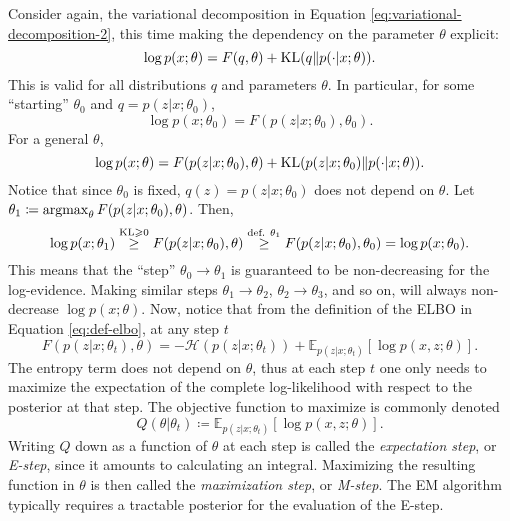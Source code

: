 \documentclass[../../main.tex]{subfiles} %
\begin{document}
Consider again, the variational decomposition in Equation 
\ref{eq:variational-decomposition-2}, this time making the dependency on 
the parameter \(\theta\) explicit:
\begin{equation*}
	\log{p(x; \theta)} = F(q, \theta) + \operatorname{KL} (q \Vert p(\cdot \vert x; 
	\theta)).
\end{equation*}
This is valid for all distributions \(q\) and parameters \(\theta\). In 
particular, for some ``starting'' \(\theta_0\) and \(q = p(z \vert x; 
\theta_0)\),
\begin{equation} \label{eq:loglik-initial}
	\log{p(x; \theta_0)} = F(p(z \vert x; \theta_0), \theta_0).
\end{equation}
For a general \(\theta\),
\begin{equation}
	\log{p(x; \theta)} = F(p(z \vert x; \theta_0), \theta) + \operatorname{KL} (p(z \vert x; 
	\theta_0) \Vert p(\cdot \vert x; 
	\theta)).
\end{equation}
Notice that since \(\theta_0\) is fixed, \(q(z) = p(z \vert x; \theta_0)\) does 
not depend on \(\theta\). Let \(\theta_1 \coloneqq \operatorname*{argmax}_\theta F(p(z \vert 
x; \theta_0), \theta)\). 
Then,
\begin{equation*}
	\log{p(x; \theta_1)} \stackrel{\operatorname{KL} \geqslant 0}{\geq} F(p(z 
	\vert x; 
	\theta_0), \theta) \stackrel{\scriptsize \text{def. } \theta_1}{\geq} F(p(z 
	\vert x; 
	\theta_0), \theta_0) = \log{p(x; \theta_0)}.
\end{equation*}
This means that the ``step'' \(\theta_0 \to \theta_1\) is guaranteed to be 
non-decreasing for the log-evidence. Making similar steps \(\theta_1 \to 
\theta_2\), \(\theta_2 \to \theta_3\), and so on, will always non-decrease 
\(\log{p(x; \theta)}\). Now, notice that from the definition of the ELBO in 
Equation \ref{eq:def-elbo}, at any step \(t\)
\begin{equation*}
	F(p(z \vert x; \theta_t), \theta) = - \mathcal{H}(p(z \vert x; \theta_t)) + 
	\mathbb E_{p(z \vert x; \theta_t)} [\log{p(x,z; \theta)}].
\end{equation*}
The entropy term does not depend on \(\theta\), thus at each step \(t\) one 
only needs to maximize the expectation of the complete log-likelihood with 
respect to the posterior at that step. The objective function to maximize is 
commonly denoted
\begin{equation} \label{eq:EM-objective}
	Q(\theta \vert \theta_t) \coloneqq \mathbb E_{p(z \vert x; \theta_t)} 
	[\log{p(x,z; \theta)}].
\end{equation}
Writing \(Q\) down as a function of \(\theta\) at each step is called the 
\textit{expectation step}, or \textit{E-step}, since it amounts to calculating 
an integral. Maximizing the resulting function in \(\theta\) is then called the 
\textit{maximization step}, or \textit{M-step}. The EM algorithm typically 
requires a tractable posterior for the evaluation of the E-step.
\end{document}
